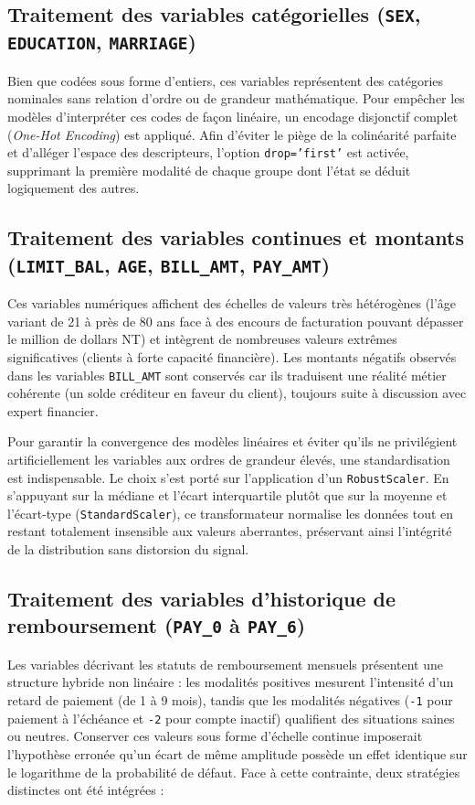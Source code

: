 \documentclass{article}
\begin{document}
\subsection{Traitement des variables catégorielles (\texttt{SEX}, \texttt{EDUCATION}, \texttt{MARRIAGE})}
Bien que codées sous forme d'entiers, ces variables représentent des catégories nominales sans relation d'ordre ou de grandeur mathématique. Pour empêcher les modèles d'interpréter ces codes de façon linéaire, un encodage disjonctif complet (\textit{One-Hot Encoding}) est appliqué. Afin d'éviter le piège de la colinéarité parfaite et d'alléger l'espace des descripteurs, l'option \texttt{drop='first'} est activée, supprimant la première modalité de chaque groupe dont l'état se déduit logiquement des autres.

\subsection{Traitement des variables continues et montants (\texttt{LIMIT\_BAL}, \texttt{AGE}, \texttt{BILL\_AMT}, \texttt{PAY\_AMT})}
Ces variables numériques affichent des échelles de valeurs très hétérogènes (l'âge variant de 21 à près de 80 ans face à des encours de facturation pouvant dépasser le million de dollars NT) et intègrent de nombreuses valeurs extrêmes significatives (clients à forte capacité financière). Les montants négatifs observés dans les variables \texttt{BILL\_AMT} sont conservés car ils traduisent une réalité métier cohérente (un solde créditeur en faveur du client), toujours suite à discussion avec expert financier. 

Pour garantir la convergence des modèles linéaires et éviter qu'ils ne privilégient artificiellement les variables aux ordres de grandeur élevés, une standardisation est indispensable. Le choix s'est porté sur l'application d'un \texttt{RobustScaler}. En s'appuyant sur la médiane et l'écart interquartile plutôt que sur la moyenne et l'écart-type (\texttt{StandardScaler}), ce transformateur normalise les données tout en restant totalement insensible aux valeurs aberrantes, préservant ainsi l'intégrité de la distribution sans distorsion du signal.

\subsection{Traitement des variables d'historique de remboursement (\texttt{PAY\_0} à \texttt{PAY\_6})}
Les variables décrivant les statuts de remboursement mensuels présentent une structure hybride non linéaire : les modalités positives mesurent l'intensité d'un retard de paiement (de 1 à 9 mois), tandis que les modalités négatives (\texttt{-1} pour paiement à l'échéance et \texttt{-2} pour compte inactif) qualifient des situations saines ou neutres. Conserver ces valeurs sous forme d'échelle continue imposerait l'hypothèse erronée qu'un écart de même amplitude possède un effet identique sur le logarithme de la probabilité de défaut. Face à cette contrainte, deux stratégies distinctes ont été intégrées :
\end{document}
